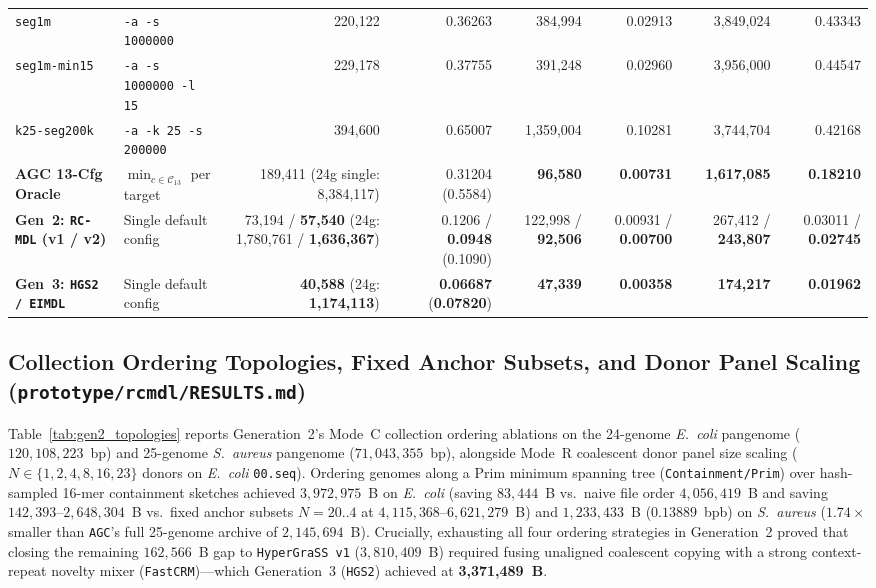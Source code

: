 \documentclass[10pt]{article}
\theoremstyle{definition}
\begin{document}
\begin{table}[h!]
{\begin{tabular}{llrrrrrr}
\texttt{seg1m} & \texttt{-a -s 1000000} & 220,122 & 0.36263 & 384,994 & 0.02913 & 3,849,024 & 0.43343 \\
\texttt{seg1m-min15} & \texttt{-a -s 1000000 -l 15} & 229,178 & 0.37755 & 391,248 & 0.02960 & 3,956,000 & 0.44547 \\
\texttt{k25-seg200k} & \texttt{-a -k 25 -s 200000} & 394,600 & 0.65007 & 1,359,004 & 0.10281 & 3,744,704 & 0.42168 \\
\midrule
\textbf{AGC 13-Cfg Oracle} & $\min_{c \in \mathcal{C}_{13}}$ per target & 189,411 (24g single: 8,384,117) & 0.31204 (0.5584) & \textbf{96,580} & \textbf{0.00731} & \textbf{1,617,085} & \textbf{0.18210} \\
\textbf{Gen~2: \texttt{RC-MDL} (v1 / v2)} & Single default config & 73,194 / \textbf{57,540} (24g: 1,780,761 / \textbf{1,636,367}) & 0.1206 / \textbf{0.0948} (0.1090) & 122,998 / \textbf{92,506} & 0.00931 / \textbf{0.00700} & 267,412 / \textbf{243,807} & 0.03011 / \textbf{0.02745} \\
\textbf{Gen~3: \texttt{HGS2 / EIMDL}} & Single default config & \textbf{40,588} (24g: \textbf{1,174,113}) & \textbf{0.06687} (\textbf{0.07820}) & \textbf{47,339} & \textbf{0.00358} & \textbf{174,217} & \textbf{0.01962} \\
\bottomrule
\end{tabular}%
}
\end{table}

\subsection{Collection Ordering Topologies, Fixed Anchor Subsets, and Donor Panel Scaling (\texttt{prototype/rcmdl/RESULTS.md})}

Table~\ref{tab:gen2_topologies} reports Generation~2's Mode~C collection ordering ablations on the 24-genome \textit{E.~coli} pangenome ($120,108,223$~bp) and 25-genome \textit{S.~aureus} pangenome ($71,043,355$~bp), alongside Mode~R coalescent donor panel size scaling ($N \in \{1,2,4,8,16,23\}$ donors on \textit{E.~coli} \texttt{00.seq}). Ordering genomes along a Prim minimum spanning tree (\texttt{Containment/Prim}) over hash-sampled 16-mer containment sketches achieved $3,972,975$~B on \textit{E.~coli} (saving $83,444$~B vs.\ naive file order $4,056,419$~B and saving $142,393\text{--}2,648,304$~B vs.\ fixed anchor subsets $N=20..4$ at $4,115,368\text{--}6,621,279$~B) and $1,233,433$~B ($0.13889$~bpb) on \textit{S.~aureus} ($1.74\times$ smaller than \texttt{AGC}'s full 25-genome archive of $2,145,694$~B). Crucially, exhausting all four ordering strategies in Generation~2 proved that closing the remaining $162,566$~B gap to \texttt{HyperGraSS v1} ($3,810,409$~B) required fusing unaligned coalescent copying with a strong context-repeat novelty mixer (\texttt{FastCRM})---which Generation~3 (\texttt{HGS2}) achieved at \textbf{3,371,489~B}.
\end{document}
